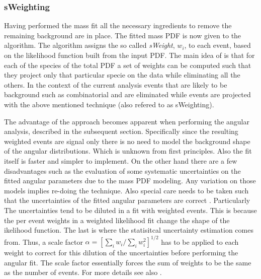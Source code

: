 \subsubsection{sWeighting}
Having performed the mass fit all the necessary ingredients to remove the remaining background are in place. 
The fitted mass PDF is now given to the \sPlot algorithm. The algorithm assigns the so called {\it sWeight}, $w_i$, to each event,
based on the likelihood function built from the input PDF. The main idea of \sPlot is that for each of the species of the total
PDF a set of weights can be computed such that they project only that particular specie on the data while eliminating all the others.  
In the context of the current analysis events that are likely to be background such as combinatorial and \LbJpsipK are
eliminated while \BJpsiKst events are projected with the above mentioned technique (also refered to as sWeighting).

The advantage of the \sWeights approach becomes apparent when performing the angular analysis, described in the subsequent section. Specifically since the resulting 
\BsJpsiKst weighted events are signal only there is no need to model the background shape of the angular distributions. Which
is unknown from first principles. Also the fit itself is faster and simpler to implement. On the other hand there are a few 
disadvantages such as the evaluation of some systematic uncertainties on the fitted angular parameters due to the mass PDF modeling.
Any variation on those models implies re-doing the \sPlot technique. Also special care needs to be taken such that the uncertainties
of the fitted angular parameters are correct \cite{splot}. Particularly The uncertainties tend to be diluted in a fit with weighted
events. This is because the per event weights in a weighted likelihood fit change the shape of the ikelihood function. The last is 
where the statisitcal uncertainty estimation comes from. Thus, a scale factor $\alpha = \left[\sum_{i} w_i /\sum_{i} w_i^2\right]^{1/2}$
has to be applied to each weight to correct for this dilution of the uncertainties before performing the angular fit. The scale factor
essentially forces the sum of weights to be the same as the number of events. For more details see also .

